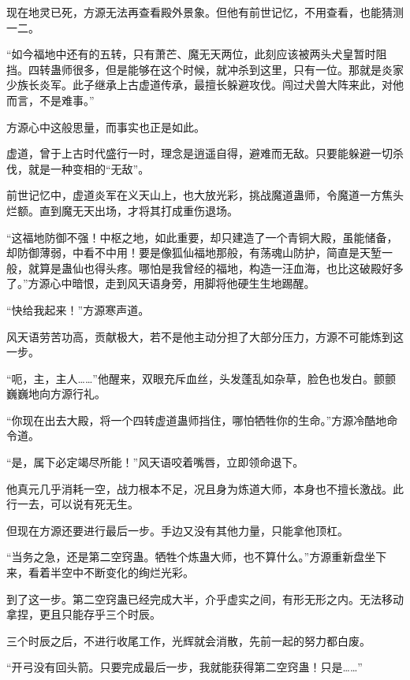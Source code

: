 
\begin{this_body}



现在地灵已死，方源无法再查看殿外景象。但他有前世记忆，不用查看，也能猜测一二。

“如今福地中还有的五转，只有萧芒、魔无天两位，此刻应该被两头犬皇暂时阻挡。四转蛊师很多，但是能够在这个时候，就冲杀到这里，只有一位。那就是炎家少族长炎军。此子继承上古虚道传承，最擅长躲避攻伐。闯过犬兽大阵来此，对他而言，不是难事。”

方源心中这般思量，而事实也正是如此。

虚道，曾于上古时代盛行一时，理念是逍遥自得，避难而无敌。只要能躲避一切杀伐，就是一种变相的“无敌”。

前世记忆中，虚道炎军在义天山上，也大放光彩，挑战魔道蛊师，令魔道一方焦头烂额。直到魔无天出场，才将其打成重伤退场。

“这福地防御不强！中枢之地，如此重要，却只建造了一个青铜大殿，虽能储备，却防御薄弱，中看不中用！要是像狐仙福地那般，有荡魂山防护，简直是天堑一般，就算是蛊仙也得头疼。哪怕是我曾经的福地，构造一汪血海，也比这破殿好多了。”方源心中暗恨，走到风天语身旁，用脚将他硬生生地踢醒。

“快给我起来！”方源寒声道。

风天语劳苦功高，贡献极大，若不是他主动分担了大部分压力，方源不可能炼到这一步。

“呃，主，主人……”他醒来，双眼充斥血丝，头发蓬乱如杂草，脸色也发白。颤颤巍巍地向方源行礼。

“你现在出去大殿，将一个四转虚道蛊师挡住，哪怕牺牲你的生命。”方源冷酷地命令道。

“是，属下必定竭尽所能！”风天语咬着嘴唇，立即领命退下。

他真元几乎消耗一空，战力根本不足，况且身为炼道大师，本身也不擅长激战。此行一去，可以说有死无生。

但现在方源还要进行最后一步。手边又没有其他力量，只能拿他顶杠。

“当务之急，还是第二空窍蛊。牺牲个炼蛊大师，也不算什么。”方源重新盘坐下来，看着半空中不断变化的绚烂光彩。

到了这一步。第二空窍蛊已经完成大半，介乎虚实之间，有形无形之内。无法移动拿捏，更且只能存乎三个时辰。

三个时辰之后，不进行收尾工作，光辉就会消散，先前一起的努力都白废。

“开弓没有回头箭。只要完成最后一步，我就能获得第二空窍蛊！只是……”


\end{this_body}
